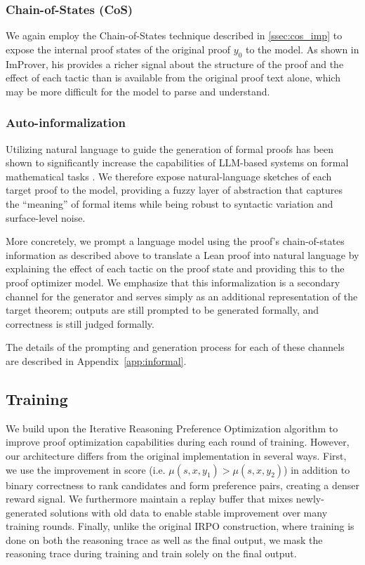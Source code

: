 \subsubsection{Chain-of-States (CoS)}
We again employ the Chain-of-States technique described in \ref{ssec:cos_imp} to expose the internal proof states of the original proof $y_0$ to the model. As shown in ImProver, his provides a richer signal about the structure of the proof and the effect of each tactic than is available from the original proof text alone, which may be more difficult for the model to parse and understand.

\subsubsection{Auto-informalization}
Utilizing natural language to guide the generation of formal proofs has been shown to significantly increase the capabilities of LLM-based systems on formal mathematical tasks \cite{DraftSketchProve}. We therefore expose natural-language sketches of each target proof to the model, providing a fuzzy layer of abstraction that captures the ``meaning'' of formal items while being robust to syntactic variation and surface-level noise. 

More concretely, we prompt a language model using the proof's chain-of-states information as described above to translate a Lean proof into natural language by explaining the effect of each tactic on the proof state and providing this to the proof optimizer model. We emphasize that this informalization is a secondary channel for the generator and serves simply as an additional representation of the target theorem; outputs are still prompted to be generated formally, and correctness is still judged formally.

The details of the prompting and generation process for each of these channels are described in Appendix~\ref{app:informal}.


\subsection{Training}
\label{sec:training}


We build upon the Iterative Reasoning Preference Optimization algorithm \cite{IRPO} to improve proof optimization capabilities during each round of training. However, our architecture differs from the original implementation in several ways. First, we use the improvement in score (i.e. $\mu(s, x, y_{1}) > \mu(s, x, y_{2})$) in addition to binary correctness to rank candidates and form preference pairs, creating a denser reward signal. We furthermore maintain a replay buffer that mixes newly-generated solutions with old data to enable stable improvement over many training rounds. 
Finally, unlike the original IRPO construction, where training is done on both the reasoning trace as well as the final output, we mask the reasoning trace during training and train solely on the final output.

